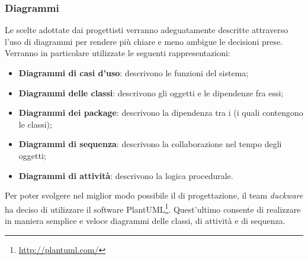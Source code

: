 \subsubsection{Diagrammi}
Le scelte adottate dai progettisti verranno adeguatamente descritte attraverso l’uso di diagrammi  per rendere più chiare e meno ambigue le decisioni prese. Verranno in particolare utilizzate le seguenti rappresentazioni:
\begin{itemize}
	\item \textbf{Diagrammi di casi d’uso}: descrivono le funzioni del sistema;
	\item \textbf{Diagrammi delle classi}: descrivono gli oggetti e le dipendenze fra essi;
	\item \textbf{Diagrammi dei package}: descrivono la dipendenza tra i  (i quali contengono le classi);
	\item \textbf{Diagrammi di sequenza}: descrivono la collaborazione nel tempo degli oggetti;
	\item \textbf{Diagrammi di attività}: descrivono la logica procedurale.
\end{itemize}
Per poter svolgere nel miglior modo possibile il  di progettazione, il team \textit{duckware} ha deciso di utilizzare il software PlantUML\footnote{\href{http://plantuml.com/}{http://plantuml.com/}}. Quest'ultimo consente di realizzare in maniera semplice e veloce diagrammi delle classi, di attività e di sequenza.
